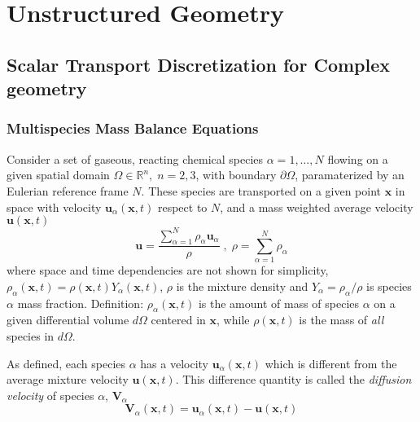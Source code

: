 






\chapter{Unstructured Geometry}


\section{Scalar Transport Discretization for Complex geometry}


\subsection{Multispecies Mass Balance Equations}

Consider a set of gaseous, reacting  chemical species $\alpha=1,\dots,N$ flowing on a given spatial domain $\Omega \in \mathbb{R}^n, \; n=2,3$, with boundary $\partial \Omega$, paramaterized by an Eulerian reference frame $N$. These species are transported on a given point $\mathbf{x}$ in space with velocity $\mathbf{u}_\alpha(\mathbf{x},t)$ respect to $N$, and a mass weighted average velocity $\mathbf{u}(\mathbf{x},t)$
%
\begin{equation}
  \mathbf{u} = \frac{ \sum\limits_{\alpha=1}^{N} {\rho_\alpha \mathbf{u}_\alpha}}{\rho} \; , \; \rho =  \sum\limits_{\alpha=1}^{N} {\rho_\alpha} \label{eq:veldens}
\end{equation}
%
where space and time dependencies are not shown for simplicity, $\rho_\alpha(\mathbf{x},t) = \rho(\mathbf{x},t) Y_\alpha (\mathbf{x},t)$, $\rho$ is the mixture density and $Y_\alpha = \rho_\alpha / \rho$ is species $\alpha$ mass fraction. Definition: $\rho_\alpha(\mathbf{x},t)$ is the amount of mass of species $\alpha$ on a given differential volume $d\Omega$ centered in $\mathbf{x}$, while  $\rho(\mathbf{x},t)$ is the mass of \textit{all} species in $d\Omega$.

As defined, each species $\alpha$ has a velocity $\mathbf{u}_\alpha(\mathbf{x},t)$ which is different from the average mixture velocity $\mathbf{u}(\mathbf{x},t)$. This difference quantity is called the \textit{diffusion velocity} of species $\alpha$, $\mathbf{V}_\alpha$
%
\begin{equation}
   \mathbf{V}_\alpha(\mathbf{x},t) = \mathbf{u}_\alpha(\mathbf{x},t) - \mathbf{u}(\mathbf{x},t) \label{eq:vdiff}
\end{equation}
%

